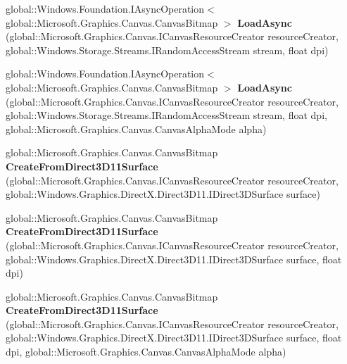 \begin{DoxyCompactItemize}
global\+::\+Windows.\+Foundation.\+I\+Async\+Operation$<$ global\+::\+Microsoft.\+Graphics.\+Canvas.\+Canvas\+Bitmap $>$ {\bfseries Load\+Async} (global\+::\+Microsoft.\+Graphics.\+Canvas.\+I\+Canvas\+Resource\+Creator resource\+Creator, global\+::\+Windows.\+Storage.\+Streams.\+I\+Random\+Access\+Stream stream, float dpi)
\item 
\mbox{\label{interface_microsoft_1_1_graphics_1_1_canvas_1_1_i_canvas_bitmap_statics_afd0875cf4cff3bb91591f059f391dbbf}} 
global\+::\+Windows.\+Foundation.\+I\+Async\+Operation$<$ global\+::\+Microsoft.\+Graphics.\+Canvas.\+Canvas\+Bitmap $>$ {\bfseries Load\+Async} (global\+::\+Microsoft.\+Graphics.\+Canvas.\+I\+Canvas\+Resource\+Creator resource\+Creator, global\+::\+Windows.\+Storage.\+Streams.\+I\+Random\+Access\+Stream stream, float dpi, global\+::\+Microsoft.\+Graphics.\+Canvas.\+Canvas\+Alpha\+Mode alpha)
\item 
\mbox{\label{interface_microsoft_1_1_graphics_1_1_canvas_1_1_i_canvas_bitmap_statics_a9060fd1c666787d1413990018a79b734}} 
global\+::\+Microsoft.\+Graphics.\+Canvas.\+Canvas\+Bitmap {\bfseries Create\+From\+Direct3\+D11\+Surface} (global\+::\+Microsoft.\+Graphics.\+Canvas.\+I\+Canvas\+Resource\+Creator resource\+Creator, global\+::\+Windows.\+Graphics.\+Direct\+X.\+Direct3\+D11.\+I\+Direct3\+D\+Surface surface)
\item 
\mbox{\label{interface_microsoft_1_1_graphics_1_1_canvas_1_1_i_canvas_bitmap_statics_aee573a2911f637d18825ba912cfe3f2e}} 
global\+::\+Microsoft.\+Graphics.\+Canvas.\+Canvas\+Bitmap {\bfseries Create\+From\+Direct3\+D11\+Surface} (global\+::\+Microsoft.\+Graphics.\+Canvas.\+I\+Canvas\+Resource\+Creator resource\+Creator, global\+::\+Windows.\+Graphics.\+Direct\+X.\+Direct3\+D11.\+I\+Direct3\+D\+Surface surface, float dpi)
\item 
\mbox{\label{interface_microsoft_1_1_graphics_1_1_canvas_1_1_i_canvas_bitmap_statics_ad53e9c0f924e391a804520ddd33144b1}} 
global\+::\+Microsoft.\+Graphics.\+Canvas.\+Canvas\+Bitmap {\bfseries Create\+From\+Direct3\+D11\+Surface} (global\+::\+Microsoft.\+Graphics.\+Canvas.\+I\+Canvas\+Resource\+Creator resource\+Creator, global\+::\+Windows.\+Graphics.\+Direct\+X.\+Direct3\+D11.\+I\+Direct3\+D\+Surface surface, float dpi, global\+::\+Microsoft.\+Graphics.\+Canvas.\+Canvas\+Alpha\+Mode alpha)

\end{DoxyCompactItemize}
